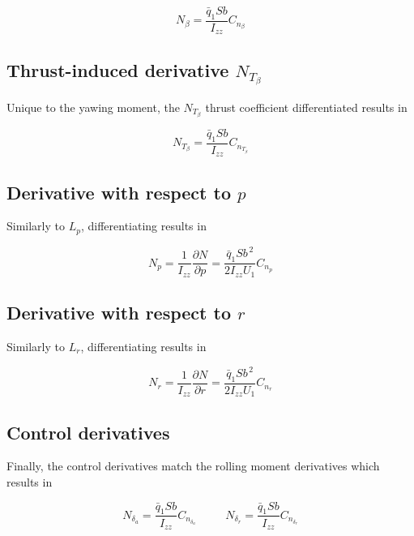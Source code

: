 \documentclass[11pt]{article}
\newcommand{\qbar}{\bar{q}}
\newcommand{\Izz}{I_{zz}}
\newcommand{\dd}[2]{\dfrac{\partial #1}{\partial #2}}
\begin{document}
\begin{equation}\label{eq:equation_46}
\boxed{\;N_\beta = \frac{\qbar_1 S b}{\Izz}C_{n_\beta}\;}
\end{equation}

\subsection{Thrust-induced derivative $N_{T_\beta}$}

Unique to the yawing moment, the $N_{T_\beta}$ thrust coefficient differentiated results in

\begin{equation}\label{eq:equation_47}
\boxed{\;N_{T_\beta} = \frac{\qbar_1 S b}{\Izz}C_{n_{T_\beta}}\;}
\end{equation}

\subsection{Derivative with respect to $p$}

Similarly to $L_p$, differentiating results in

\begin{equation}\label{eq:equation_48}
\boxed{\;N_p = \frac{1}{\Izz}\dd{N}{p}
       = \frac{\qbar_1 S b^{\,2}}{2\Izz U_1}C_{n_p}\;}
\end{equation}

\subsection{Derivative with respect to $r$}

Similarly to $L_r$, differentiating results in

\begin{equation}\label{eq:equation_49}
\boxed{\;N_r = \frac{1}{\Izz}\dd{N}{r}
       = \frac{\qbar_1 S b^{\,2}}{2\Izz U_1}C_{n_r}\;}
\end{equation}

\subsection{Control derivatives}

Finally, the control derivatives match the rolling moment derivatives which results in

\begin{equation}\label{eq:equation_50}
\boxed{\;N_{\delta_a} = \frac{\qbar_1 S b}{\Izz}C_{n_{\delta_a}}\;}
\qquad
\boxed{\;N_{\delta_r} = \frac{\qbar_1 S b}{\Izz}C_{n_{\delta_r}}\;}
\end{equation}
\end{document}
